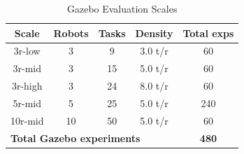 \begin{table}[h]
\centering
\caption{Gazebo Evaluation Scales}
\label{tab:scales}
\renewcommand{\arraystretch}{1.15}
\begin{tabular}{@{}ccccc@{}}
\toprule
Scale & Robots & Tasks & Density & Total exps \\
\midrule
3r-low    & 3 & 9  & 3.0 t/r & 60 \\
3r-mid    & 3 & 15 & 5.0 t/r & 60 \\
3r-high   & 3 & 24 & 8.0 t/r & 60 \\
5r-mid    & 5 & 25 & 5.0 t/r & 240 \\
10r-mid   & 10 & 50 & 5.0 t/r & 60 \\
\midrule
\multicolumn{4}{l}{\textbf{Total Gazebo experiments}} & \textbf{480} \\
\bottomrule
\end{tabular}
\end{table}
